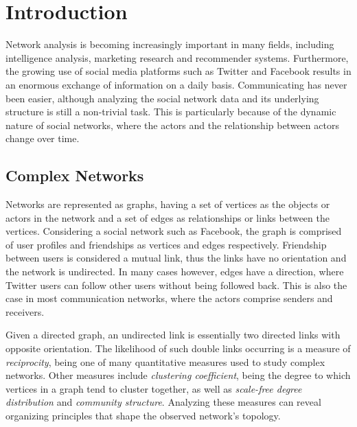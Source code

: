 \chapter{Introduction}\label{ch:Introduction}
    
Network analysis is becoming increasingly important in many fields, including intelligence analysis, marketing research and recommender systems. Furthermore, the growing use of social media platforms such as Twitter and Facebook results in an enormous exchange of information on a daily basis. Communicating has never been easier, although analyzing the social network data and its underlying structure is still a non-trivial task. This is particularly because of the dynamic nature of social networks, where the actors and the relationship between actors change over time.


\section{Complex Networks}

    Networks are represented as graphs, having a set of vertices as the objects or actors in the network and a set of edges as relationships or links between the vertices. Considering a social network such as Facebook, the graph is comprised of user profiles and friendships as vertices and edges respectively. Friendship between users is considered a mutual link, thus the links have no orientation and the network is undirected. In many cases however, edges have a direction, where Twitter users can follow other users without being followed back. This is also the case in most communication networks, where the actors comprise senders and receivers. 
    
    Given a directed graph, an undirected link is essentially two directed links with opposite orientation. The likelihood of such double links occurring is a measure of \emph{reciprocity}, being one of many quantitative measures used to study complex networks. Other measures include \emph{clustering coefficient}, being the degree to which vertices in a graph tend to cluster together, as well as \emph{scale-free degree distribution} and \emph{community structure}. Analyzing these measures can reveal organizing principles that shape the observed network's topology.
    
